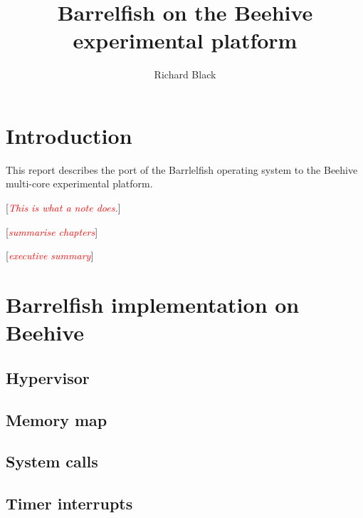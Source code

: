 \documentclass[a4paper,twoside]{report} %
\title{Barrelfish on the Beehive experimental platform}   %
\author{Richard Black}	%
\newcommand{\note}[1]{[\textcolor{red}{\textit{#1}}]}
\begin{document}
\maketitle

%
%
\begin{versionhistory}
\end{versionhistory}


\chapter{Introduction}

This report describes the port of the Barrlelfish operating system to
the Beehive multi-core experimental platform.

\note{This is what a note does.}

\note{summarise chapters}

\note{executive summary}

\chapter{Barrelfish implementation on Beehive}

\section{Hypervisor}

\section{Memory map}

\section{System calls}

\section{Timer interrupts}
\end{document}
